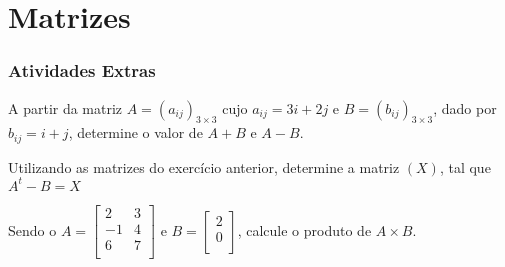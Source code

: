 \chapter{Matrizes}
\subsection{Atividades Extras}

	\item A partir da matriz $A=(a_{ij})_{3\times3}$ cujo $a_{ij} = 3i+2j$ e $B=(b_{ij})_{3\times3}$, dado por $b_{ij}=i+j$, determine o valor de $A+B$ e $A-B$.
	
	\item Utilizando as matrizes do exercício anterior, determine a matriz $(X)$, tal que $A^t-B=X$
	
	\item Sendo o $A=\left[\begin{array}{cc} 2 & 3\\ -1 & 4\\ 6 & 7\\ \end{array}\right]$ e $B = \left[\begin{array}{c}	2\\ 0\\ \end{array}\right]$, calcule  o produto de $A\times B$.
